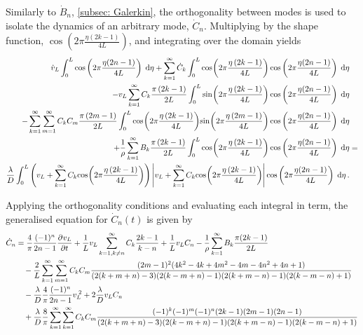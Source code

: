 Similarly to $\dot{B}_n$, \cref{subsec: Galerkin}, the orthogonality between modes is used to isolate the dynamics of an arbitrary mode, $\dot{C}_n$. Multiplying by the shape function, $\cos\left(2\pi\frac{\eta(2k-1)}{4L}\right)$, and integrating over the domain yields
~
\begin{equation*}
\begin{split}
    \dot{v}_L \int^L_0 \cos\left(2\pi\frac{\eta(2n-1)}{4L}\right) \Idx{\eta}
    + \sum_{k=1}^{\infty} \dot{C}_k \int^L_0 \fun{cos}{2\pi \frac{\eta \left( 2 k - 1 \right)}{4L}} \cos\left(2\pi\frac{\eta(2n-1)}{4L}\right) \Idx{\eta}
    & \\ %
    - v_L \sum_{k=1}^{\infty} C_k \frac{\pi \left( 2 k - 1 \right)}{2L} \int^L_0 \fun{sin}{2\pi \frac{\eta \left( 2 k - 1 \right)}{4L}} \cos\left(2\pi\frac{\eta(2n-1)}{4L}\right) \Idx{\eta}
    & \\ %
    - \sum_{k=1}^{\infty} \sum_{m=1}^{\infty} C_k C_m \frac{\pi \left( 2 m - 1 \right)}{2L} \int^L_0 \fun{cos}{2\pi \frac{\eta \left( 2 k - 1 \right)}{4L}} \fun{sin}{2\pi \frac{\eta \left( 2 m - 1 \right)}{4L}} \cos\left(2\pi\frac{\eta(2n-1)}{4L}\right) \Idx{\eta}
    & \\ %
    + \frac{1}{\rho} \sum_{k=1}^{\infty} B_k \frac{\pi \left( 2 k - 1 \right)}{2L} \int^L_0 \fun{cos}{2\pi \frac{\eta \left( 2 k - 1 \right)}{4L}} \cos\left(2\pi\frac{\eta(2n-1)}{4L}\right) \Idx{\eta}
    &= \\ %
    \frac{\lambda}{D} \int^L_0 \left( v_L + \sum_{k=1}^{\infty} C_k \fun{cos}{2\pi \frac{\eta \left( 2 k - 1 \right)}{4L}} \right) \left| v_L + \sum_{k=1}^{\infty} C_k \fun{cos}{2\pi \frac{\eta \left( 2 k - 1 \right)}{4L}} \right| \cos\left(2\pi\frac{\eta(2n-1)}{4L}\right) \Idx{\eta} \, .
\end{split}
\end{equation*}

Applying the orthogonality conditions and evaluating each integral in term, the generalised equation for $\dot{C}_n(t)$ is given by
~
\begin{equation*}
\begin{split}
    \dot{C}_n &=
    \frac{4}{\pi} \frac{(-1)^n}{2n-1} \pdiff{v_L}{t}
    + \frac{1}{L} v_L \sum^{\infty}_{k=1,k \neq n} C_k \frac{2k-1}{k-n}
    + \frac{1}{L} v_L C_n
    - \frac{1}{\rho} \sum^{\infty}_{k=1} B_k \frac{\pi (2k-1)}{2L}
    \\ & \quad %
    - \frac{2}{L} \sum^{\infty}_{k=1} \sum^{\infty}_{m=1} C_k C_m \frac{
    (2m-1)^2 (4k^2 - 4k + 4m^2 - 4m - 4n^2 + 4n + 1)
    }{
    (2(k+m+n)-3)(2(k-m+n)-1)(2(k+m-n)-1)(2(k-m-n)+1)
    }
    \\ & \quad %
    - \frac{\lambda}{D} \frac{4}{\pi} \frac{(-1)^n}{2n-1} v_L\power{2}
    + 2 \frac{\lambda}{D} v_L C_n
    \\ & \quad %
    + \frac{\lambda}{D} \frac{8}{\pi} \sum^{\infty}_{k=1} \sum^{\infty}_{k=1} C_k C_m \frac{
    (-1)^k (-1)^m (-1)^n (2k-1) (2m-1) (2n-1)
    }{
    (2(k+m+n)-3)(2(k-m+n)-1)(2(k+m-n)-1)(2(k-m-n)+1)
    }
\end{split}
\end{equation*}